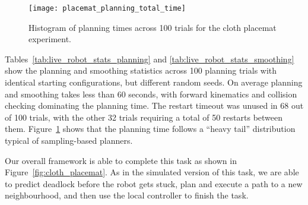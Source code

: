 \begin{figure}
    \centering
    \texttt{[image: placemat\_planning\_total\_time]}
    \caption{Histogram of planning times across 100 trials for the cloth placemat experiment.}
    \label{fig:placemat_planning_time}
\end{figure}

Tables~\ref{tab:live_robot_stats_planning} and \ref{tab:live_robot_stats_smoothing} show the planning and smoothing statistics across 100 planning trials with identical starting configurations, but different random seeds. On average planning and smoothing takes less than 60 seconds, with forward kinematics and collision checking dominating the planning time. The restart timeout was unused in 68 out of 100 trials, with the other 32 trials requiring a total of 50 restarts between them. Figure~\ref{fig:placemat_planning_time} shows that the planning time follows a ``heavy tail'' distribution typical of sampling-based planners.

Our overall framework is able to complete this task as shown in Figure~\ref{fig:cloth_placemat}. As in the simulated version of this task, we are able to predict deadlock before the robot gets stuck, plan and execute a path to a new neighbourhood, and then use the local controller to finish the task.




